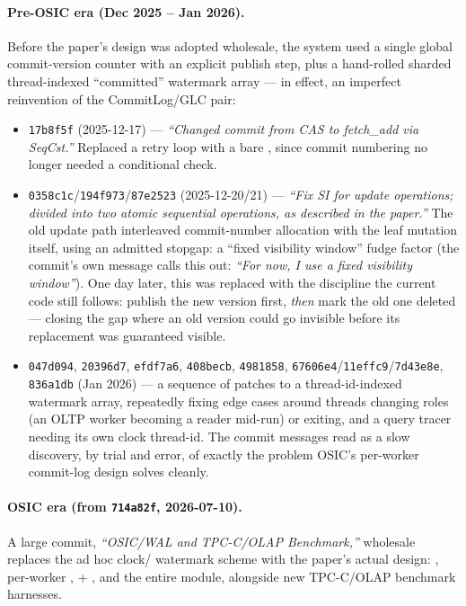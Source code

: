 \documentclass[11pt]{article}
\newcommand{\commit}[1]{\texttt{#1}}
\begin{document}
\paragraph{Pre-OSIC era (Dec 2025 -- Jan 2026).} Before the paper's design was adopted
wholesale, the system used a single global commit-version counter with an explicit
publish step, plus a hand-rolled sharded thread-indexed ``committed'' watermark array ---
in effect, an imperfect reinvention of the CommitLog/GLC pair:
\begin{itemize}
  \item \commit{17b8f5f} (2025-12-17) --- \emph{``Changed commit from CAS to fetch\_add
        via SeqCst.''} Replaced a  retry loop with a bare
        , since commit numbering no longer needed a conditional check.
  \item \commit{0358c1c}/\commit{194f973}/\commit{87e2523} (2025-12-20/21) --- \emph{``Fix
        SI for update operations; divided into two atomic sequential operations, as
        described in the paper.''} The old update path interleaved commit-number
        allocation with the leaf mutation itself, using an admitted stopgap: a
         ``fixed visibility window'' fudge
        factor (the commit's own message calls this out: \emph{``For now, I use a fixed
        visibility window''}). One day later, this was replaced with the discipline the
        current code still follows: publish the new version first, \emph{then} mark the
        old one deleted --- closing the gap where an old version could go invisible
        before its replacement was guaranteed visible.
  \item \commit{047d094}, \commit{20396d7}, \commit{efdf7a6}, \commit{408becb},
        \commit{4981858}, \commit{67606e4}/\commit{11effc9}/\commit{7d43e8e},
        \commit{836a1db} (Jan 2026) --- a sequence of patches to a
        thread-id-indexed watermark array, repeatedly fixing edge cases around threads
        changing roles (an OLTP worker becoming a reader mid-run) or exiting, and a
        query tracer needing its own clock thread-id. The commit messages read as a
        slow discovery, by trial and error, of exactly the problem OSIC's per-worker
        commit-log design solves cleanly.
\end{itemize}

\paragraph{OSIC era (from \commit{714a82f}, 2026-07-10).} A large commit,
\emph{``OSIC/WAL and TPC-C/OLAP Benchmark,''} wholesale replaces the ad hoc clock/
watermark scheme with the paper's actual design: , per-worker
,  + , and the entire
 module, alongside new TPC-C/OLAP benchmark harnesses.
\end{document}
